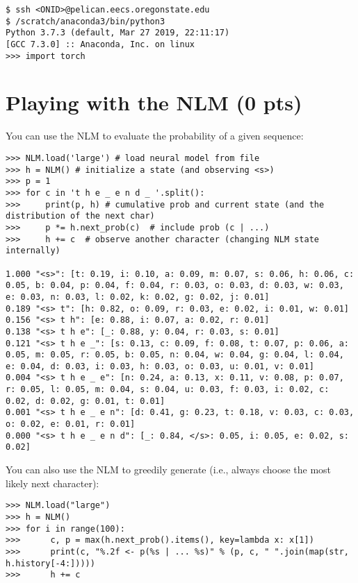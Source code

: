 \documentclass{article}
\begin{document}
\begin{verbatim}
$ ssh <ONID>@pelican.eecs.oregonstate.edu
$ /scratch/anaconda3/bin/python3
Python 3.7.3 (default, Mar 27 2019, 22:11:17)
[GCC 7.3.0] :: Anaconda, Inc. on linux
>>> import torch
\end{verbatim}

\section{Playing with the NLM (0 pts)}

You can use the NLM to evaluate the probability of a given sequence:

\begin{verbatim}
>>> NLM.load('large') # load neural model from file
>>> h = NLM() # initialize a state (and observing <s>)
>>> p = 1
>>> for c in 't h e _ e n d _ '.split():
>>>     print(p, h) # cumulative prob and current state (and the distribution of the next char)
>>>     p *= h.next_prob(c)  # include prob (c | ...)
>>>     h += c  # observe another character (changing NLM state internally)
        
1.000 "<s>": [t: 0.19, i: 0.10, a: 0.09, m: 0.07, s: 0.06, h: 0.06, c: 0.05, b: 0.04, p: 0.04, f: 0.04, r: 0.03, o: 0.03, d: 0.03, w: 0.03, e: 0.03, n: 0.03, l: 0.02, k: 0.02, g: 0.02, j: 0.01]
0.189 "<s> t": [h: 0.82, o: 0.09, r: 0.03, e: 0.02, i: 0.01, w: 0.01]
0.156 "<s> t h": [e: 0.88, i: 0.07, a: 0.02, r: 0.01]
0.138 "<s> t h e": [_: 0.88, y: 0.04, r: 0.03, s: 0.01]
0.121 "<s> t h e _": [s: 0.13, c: 0.09, f: 0.08, t: 0.07, p: 0.06, a: 0.05, m: 0.05, r: 0.05, b: 0.05, n: 0.04, w: 0.04, g: 0.04, l: 0.04, e: 0.04, d: 0.03, i: 0.03, h: 0.03, o: 0.03, u: 0.01, v: 0.01]
0.004 "<s> t h e _ e": [n: 0.24, a: 0.13, x: 0.11, v: 0.08, p: 0.07, r: 0.05, l: 0.05, m: 0.04, s: 0.04, u: 0.03, f: 0.03, i: 0.02, c: 0.02, d: 0.02, g: 0.01, t: 0.01]
0.001 "<s> t h e _ e n": [d: 0.41, g: 0.23, t: 0.18, v: 0.03, c: 0.03, o: 0.02, e: 0.01, r: 0.01]
0.000 "<s> t h e _ e n d": [_: 0.84, </s>: 0.05, i: 0.05, e: 0.02, s: 0.02]
\end{verbatim}

You can also use the NLM to greedily generate (i.e., always choose the most likely next character):

\begin{verbatim}
>>> NLM.load("large")
>>> h = NLM()
>>> for i in range(100):
>>>      c, p = max(h.next_prob().items(), key=lambda x: x[1])
>>>      print(c, "%.2f <- p(%s | ... %s)" % (p, c, " ".join(map(str, h.history[-4:]))))
>>>      h += c
\end{verbatim}
\end{document}
